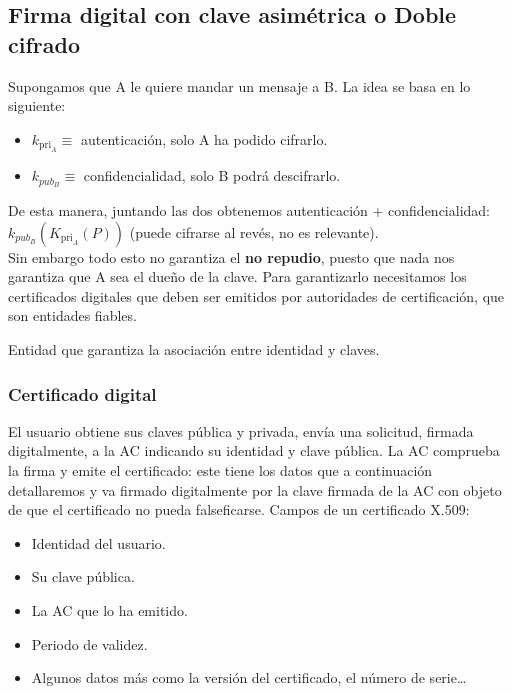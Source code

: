 \subsection{Firma digital con clave asimétrica o Doble cifrado}

Supongamos que A le quiere mandar un mensaje a B. La idea se basa en lo siguiente:
\begin{itemize}
    \item $k_{\text{pri}_A}\equiv$ autenticación, solo A ha podido cifrarlo.
    \item $k_{pub_B}\equiv$ confidencialidad, solo B podrá descifrarlo.
\end{itemize}
De esta manera, juntando las dos obtenemos autenticación + confidencialidad: $k_{pub_B}(K_{\text{pri}_A} (P))$ (puede cifrarse al revés, no es relevante).\\

Sin embargo todo esto no garantiza el \textbf{no repudio}, puesto que nada nos garantiza que A sea el dueño de la clave. Para garantizarlo necesitamos los certificados digitales que deben ser emitidos por autoridades de certificación, que son entidades fiables. 

\begin{definicion}
    Entidad que garantiza la asociación entre identidad y claves.
\end{definicion}

\subsubsection{Certificado digital}
El usuario obtiene sus claves pública y privada, envía una solicitud, firmada digitalmente, a la AC indicando su identidad y clave pública. La AC comprueba la firma y emite el certificado: este tiene los datos que a continuación detallaremos y va firmado digitalmente por la clave firmada de la AC con objeto de que el certificado no pueda falseficarse. Campos de un certificado X\@.509:
\begin{itemize}
    \item Identidad del usuario.
    \item Su clave pública.
    \item La AC que lo ha emitido.
    \item Periodo de validez.
    \item Algunos datos más como la versión del certificado, el número de serie\ldots
\end{itemize}

